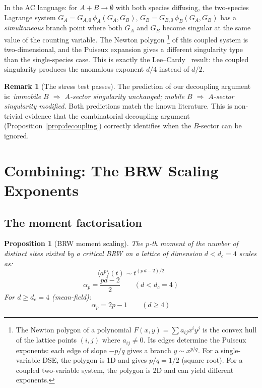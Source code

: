 \documentclass[11pt,a4paper]{article}
\newtheorem{proposition}[theorem]{Proposition}
\theoremstyle{definition}
\newtheorem*{remark}{Remark}
\begin{document}
In the AC language: for $A{+}B \to \emptyset$ with both species diffusing,
the two-species Lagrange system
$G_A = G_{A,0}\,\phi_A(G_A, G_B)$,
$G_B = G_{B,0}\,\phi_B(G_A, G_B)$
has a \emph{simultaneous} branch point where both $G_A$ and $G_B$ become
singular at the same value of the counting variable.
The Newton polygon%
\footnote{The Newton polygon of a polynomial $F(x,y) = \sum a_{ij}x^i y^j$
is the convex hull of the lattice points $(i,j)$ where $a_{ij} \neq 0$.
Its edges determine the Puiseux exponents: each edge of slope $-p/q$
gives a branch $y \sim x^{p/q}$. For a single-variable DSE, the polygon
is 1D and gives $p/q = 1/2$ (square root). For a coupled two-variable
system, the polygon is 2D and can yield different exponents.}
of this coupled system is two-dimensional, and the
Puiseux expansion gives a different singularity type than the
single-species case. This is exactly the Lee--Cardy~\cite{leecardy1995}
result: the coupled singularity produces the anomalous exponent $d/4$
instead of $d/2$.

\begin{remark}[The stress test passes]
The prediction of our decoupling argument is:
\emph{immobile $B$ $\Rightarrow$ $A$-sector singularity unchanged;
mobile $B$ $\Rightarrow$ $A$-sector singularity modified.}
Both predictions match the known literature. This is non-trivial
evidence that the combinatorial decoupling argument
(Proposition~\ref{prop:decoupling}) correctly identifies when the
$B$-sector can be ignored.
\end{remark}

\section{Combining: The BRW Scaling Exponents}
\label{sec:combined}

\subsection{The moment factorisation}

\begin{proposition}[BRW moment scaling]
\label{prop:brw_exponents}
The $p$-th moment of the number of distinct sites visited by a critical BRW
on a lattice of dimension $d < d_c = 4$ scales as:
\begin{equation}
\langle a^p \rangle(t) \sim t^{(p\,d - 2)/2}
\end{equation}
\begin{equation}
\boxed{\alpha_p = \frac{pd - 2}{2} \qquad (d < d_c = 4)}
\label{eq:alpha_p}
\end{equation}
For $d \geq d_c = 4$ (mean-field):
\begin{equation}
\boxed{\alpha_p = 2p - 1 \qquad (d \geq 4)}
\label{eq:alpha_p_mf}
\end{equation}
\end{proposition}
\end{document}

